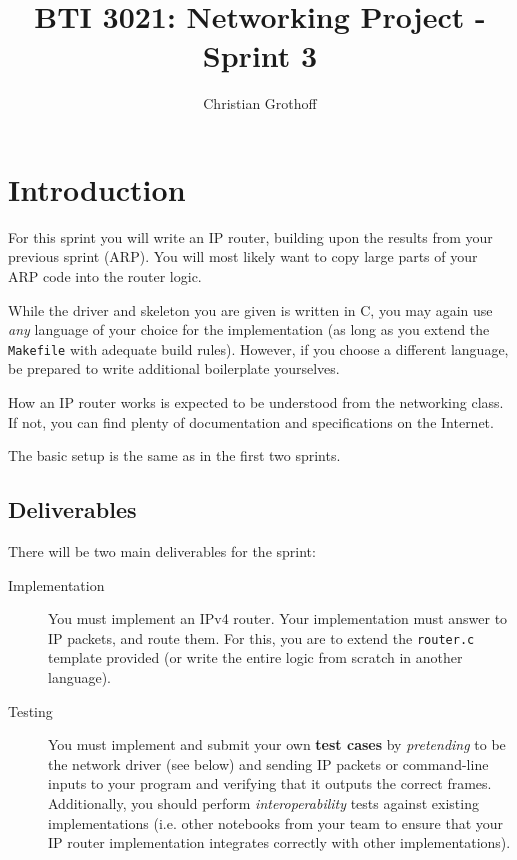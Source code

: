 \documentclass{article}
\title{BTI 3021: Networking Project - Sprint 3}
\author{Christian Grothoff}
\date{}
\begin{document}
\maketitle

\section{Introduction}

For this sprint you will write an IP router, building upon the
results from your previous sprint (ARP). You will most likely
want to copy large parts of your ARP code into the router logic.

While the driver and skeleton you are given is written in C, you may
again use {\em any} language of your choice for the implementation (as
long as you extend the {\tt Makefile} with adequate build rules).
However, if you choose a different language, be prepared to write
additional boilerplate yourselves.

How an IP router works is expected to be understood from the
networking class. If not, you can find plenty of documentation and
specifications on the Internet.

The basic setup is the same as in the first two sprints.

\subsection{Deliverables}

There will be two main deliverables for the sprint:

\begin{description}
\item[Implementation] You must implement an IPv4 router. Your
  implementation must answer to IP packets, and route them.
  For this, you are to extend the {\tt router.c} template provided
  (or write the entire logic from scratch in another language).
\item[Testing] You must implement and submit your own {\bf test cases}
  by {\em pretending} to be the network driver (see below) and sending
  IP packets or command-line inputs to your program and verifying that it
  outputs the correct frames. Additionally, you should perform
  {\em interoperability} tests against existing
  implementations (i.e. other notebooks from your team to ensure that
  your IP router implementation integrates correctly with other
  implementations).
\end{description}
\end{document}
